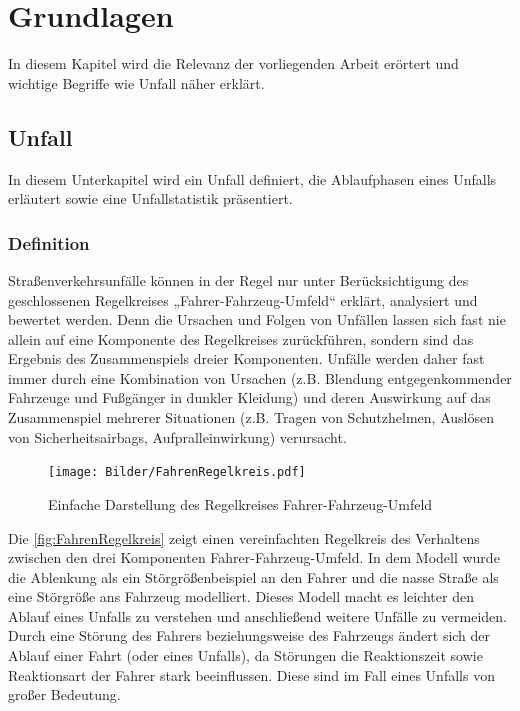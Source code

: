 \chapter{Grundlagen}
In diesem Kapitel wird die Relevanz der vorliegenden Arbeit erörtert und wichtige Begriffe wie \glqq Unfall\grqq{} näher erklärt.

%
%
\section{Unfall}
In diesem Unterkapitel wird ein Unfall definiert, die Ablaufphasen eines Unfalls er\-läut\-ert sowie eine Unfallstatistik präsentiert.
%
%
%
%
\subsection{Definition}
Straßenverkehrsunfälle können in der Regel nur unter Berücksichtigung des geschlossenen Regelkreises „Fahrer-Fahrzeug-Umfeld“ erklärt, analysiert und bewertet werden. Denn die Ursachen und Folgen von Unfällen lassen sich fast nie allein auf eine Komponente des Regelkreises zurückführen, sondern sind das Ergebnis des Zusammenspiels dreier Komponenten. Unfälle werden daher fast immer durch eine Kombination von Ursachen (z.B. Blendung entgegenkommender Fahrzeuge und Fußgänger in dunkler Kleidung) und deren Auswirkung auf das Zusammenspiel mehrerer Situationen (z.B. Tragen von Schutzhelmen, Auslösen von Sicherheitsairbags, Aufpralleinwirkung) verursacht. \citep{Appel2002}

\begin{figure}
	\centering
	\texttt{[image: Bilder/FahrenRegelkreis.pdf]} %
	\caption{Einfache Darstellung des Regelkreises 	\glq Fahrer-Fahrzeug-Umfeld\grq \citep{Appel2002}} 
	\label{fig:FahrenRegelkreis}
\end{figure}

Die \autoref{fig:FahrenRegelkreis} zeigt einen vereinfachten Regelkreis des Verhaltens zwischen den drei Komponenten \glqq Fahrer-Fahrzeug-Umfeld\grqq{}. In dem Modell wurde die Ablenkung als ein Störgrößenbeispiel an den Fahrer und die nasse Straße als eine Störgröße ans Fahrzeug modelliert. Dieses Modell macht es leichter den Ablauf eines Unfalls zu verstehen und anschließend weitere Unfälle zu vermeiden. Durch eine Störung des Fahrers beziehungsweise des Fahrzeugs ändert sich der Ablauf einer Fahrt (oder eines Unfalls), da Störungen die Reaktionszeit sowie Reaktionsart der Fahrer stark beeinflussen. Diese sind im Fall eines Unfalls von großer Bedeutung. \\


